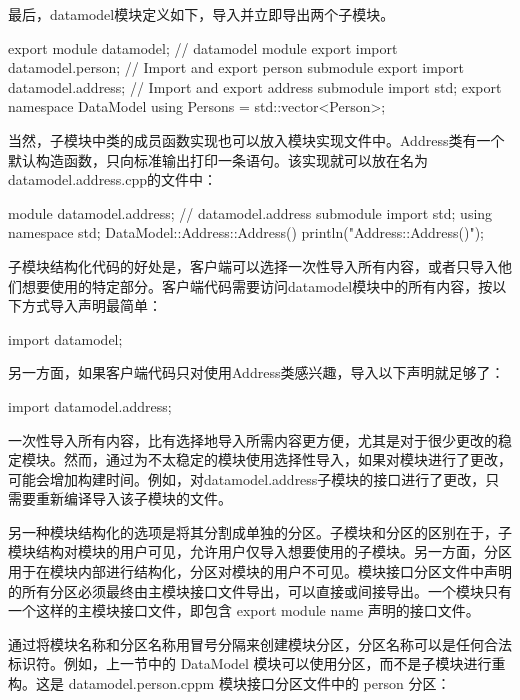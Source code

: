最后，datamodel模块定义如下，导入并立即导出两个子模块。

\begin{cpp}
export module datamodel; // datamodel module
export import datamodel.person; // Import and export person submodule
export import datamodel.address; // Import and export address submodule
import std;
export namespace DataModel { using Persons = std::vector<Person>; }
\end{cpp}

当然，子模块中类的成员函数实现也可以放入模块实现文件中。Address类有一个默认构造函数，只向标准输出打印一条语句。该实现就可以放在名为datamodel.address.cpp的文件中：

\begin{cpp}
module datamodel.address; // datamodel.address submodule
import std;
using namespace std;
DataModel::Address::Address() { println("Address::Address()"); }
\end{cpp}

子模块结构化代码的好处是，客户端可以选择一次性导入所有内容，或者只导入他们想要使用的特定部分。客户端代码需要访问datamodel模块中的所有内容，按以下方式导入声明最简单：

\begin{cpp}
import datamodel;
\end{cpp}

另一方面，如果客户端代码只对使用Address类感兴趣，导入以下声明就足够了：

\begin{cpp}
import datamodel.address;
\end{cpp}

一次性导入所有内容，比有选择地导入所需内容更方便，尤其是对于很少更改的稳定模块。然而，通过为不太稳定的模块使用选择性导入，如果对模块进行了更改，可能会增加构建时间。例如，对datamodel.address子模块的接口进行了更改，只需要重新编译导入该子模块的文件。


另一种模块结构化的选项是将其分割成单独的分区。子模块和分区的区别在于，子模块结构对模块的用户可见，允许用户仅导入想要使用的子模块。另一方面，分区用于在模块内部进行结构化，分区对模块的用户不可见。模块接口分区文件中声明的所有分区必须最终由主模块接口文件导出，可以直接或间接导出。一个模块只有一个这样的主模块接口文件，即包含 export module name 声明的接口文件。

通过将模块名称和分区名称用冒号分隔来创建模块分区，分区名称可以是任何合法标识符。例如，上一节中的 DataModel 模块可以使用分区，而不是子模块进行重构。这是 datamodel.person.cppm 模块接口分区文件中的 person 分区：

